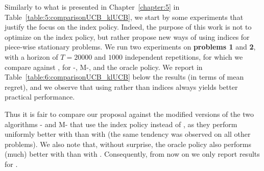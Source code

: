 
Similarly to what is presented in Chapter~\ref{chapter:5} in Table~\ref{table:5:comparisonUCB_klUCB}, we start by some experiments that justify the focus on the \klUCB{} index policy.
Indeed, the purpose of this work is not to optimize on the index policy, but rather propose new ways of using indices for piece-wise stationary problems.
%
We run two experiments on \textbf{problems 1} and \textbf{2}, with a horizon of $T=20000$ and $1000$ independent repetitions,
for which we compare \UCB{} against \klUCB, for \CUSUM-, M-, \GLR{} and the oracle policy.
We report in Table~\ref{table:6:comparisonUCB_klUCB} below the results (in terms of mean regret),
and we observe that using \klUCB{} rather than \UCB{} indices always yields better practical performance.

Thus it is fair to compare our proposal against the modified versions of the two algorithms \CUSUM- and $\mathrm{M}$- that use the \klUCB{} index policy instead of \UCB, as they perform uniformly better with \klUCB{} than with \UCB{} (the same tendency was observed on all other problems).
We also note that, without surprise, the oracle policy also performs (much) better with \klUCB{} than with \UCB.
Consequently, from now on we only report results for \klUCB.

